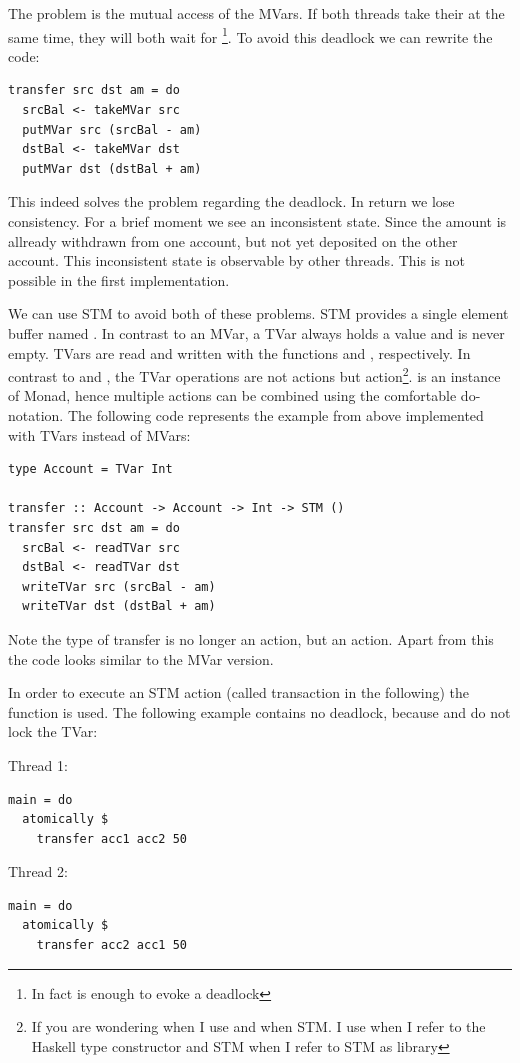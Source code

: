 The problem is the mutual access of the MVars. If both threads take their  at the same time, they will both wait for 
\footnote{In fact is  enough to evoke a deadlock}. To avoid this deadlock we can rewrite the code:
\begin{lstlisting}
transfer src dst am = do
  srcBal <- takeMVar src
  putMVar src (srcBal - am)
  dstBal <- takeMVar dst
  putMVar dst (dstBal + am)
\end{lstlisting}
This indeed solves the problem regarding the deadlock. In return we lose consistency. For a brief moment we see an inconsistent state. Since
the amount is allready withdrawn from one account, but not yet deposited on the other account. This inconsistent state is observable by other 
threads. This is not possible in the first implementation. 

We can use STM to avoid both of these problems. STM provides a single element buffer named . In contrast to an MVar, a 
TVar always holds a value and is never empty. TVars are read and written with the functions  and , respectively. 
In contrast to  and , the TVar operations are not  actions but  action\footnote{If 
you are wondering when I use  and when STM. I use  when I refer to the Haskell type constructor and STM when I refer to STM as library}. 
 is an instance of Monad, hence multiple  actions can be combined
using the comfortable do-notation. The following code represents the example from above implemented with TVars instead of MVars:
\begin{lstlisting}
type Account = TVar Int

transfer :: Account -> Account -> Int -> STM ()
transfer src dst am = do
  srcBal <- readTVar src
  dstBal <- readTVar dst
  writeTVar src (srcBal - am)
  writeTVar dst (dstBal + am)
\end{lstlisting}
Note the type of transfer is no longer an  action, but an  action. Apart from this the code looks
similar to the MVar version.

In order to execute an STM action (called transaction in the following) the function  is used. 
The following example contains no deadlock, because  and  do not lock the TVar:
\par\noindent
\begin{minipage}[t]{.45\textwidth}
Thread 1:
\begin{lstlisting}[frame=lrtb]
main = do
  atomically $
    transfer acc1 acc2 50
\end{lstlisting}
\end{minipage}
\hfill
\begin{minipage}[t]{.45\textwidth}
Thread 2:
\begin{lstlisting}[frame=lrtb]
main = do 
  atomically $ 
    transfer acc2 acc1 50
\end{lstlisting}
\end{minipage}

